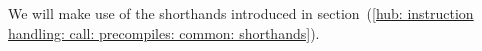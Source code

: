 We will make use of the shorthands introduced in
section~(\ref{hub: instruction handling: call: precompiles: common: shorthands}).
